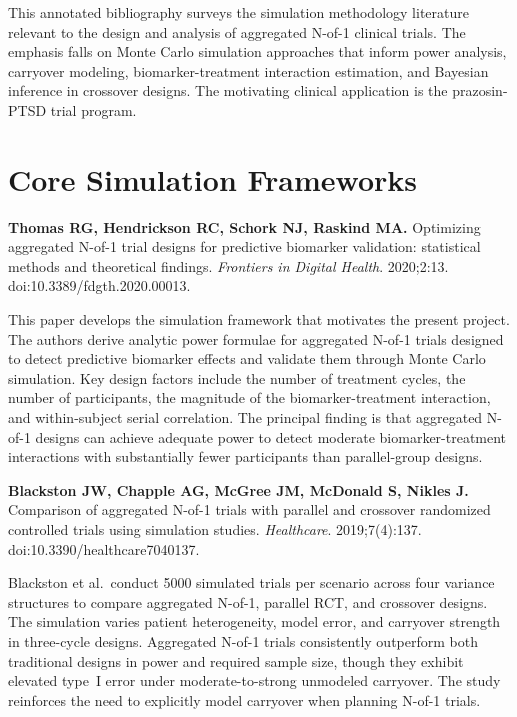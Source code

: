 \documentclass[11pt]{article}
\begin{document}
\maketitle
\thispagestyle{fancy}

This annotated bibliography surveys the simulation
methodology literature relevant to the design and analysis
of aggregated N-of-1 clinical trials. The emphasis falls on
Monte Carlo simulation approaches that inform power
analysis, carryover modeling, biomarker-treatment
interaction estimation, and Bayesian inference in crossover
designs. The motivating clinical application is the
prazosin-PTSD trial program.

\section{Core Simulation Frameworks}

\textbf{Thomas RG, Hendrickson RC, Schork NJ, Raskind MA.}
Optimizing aggregated N-of-1 trial designs for predictive
biomarker validation: statistical methods and theoretical
findings. \textit{Frontiers in Digital Health}.
2020;2:13. doi:10.3389/fdgth.2020.00013.

\smallskip\noindent
This paper develops the simulation framework that motivates
the present project. The authors derive analytic power
formulae for aggregated N-of-1 trials designed to detect
predictive biomarker effects and validate them through
Monte Carlo simulation. Key design factors include the
number of treatment cycles, the number of participants,
the magnitude of the biomarker-treatment interaction, and
within-subject serial correlation. The principal finding is
that aggregated N-of-1 designs can achieve adequate power
to detect moderate biomarker-treatment interactions with
substantially fewer participants than parallel-group
designs.

\medskip
\textbf{Blackston JW, Chapple AG, McGree JM, McDonald S,
Nikles J.} Comparison of aggregated N-of-1 trials with
parallel and crossover randomized controlled trials using
simulation studies. \textit{Healthcare}. 2019;7(4):137.
doi:10.3390/healthcare7040137.

\smallskip\noindent
Blackston et al.\ conduct 5000 simulated trials per
scenario across four variance structures to compare
aggregated N-of-1, parallel RCT, and crossover designs.
The simulation varies patient heterogeneity, model error,
and carryover strength in three-cycle designs. Aggregated
N-of-1 trials consistently outperform both traditional
designs in power and required sample size, though they
exhibit elevated type~I error under moderate-to-strong
unmodeled carryover. The study reinforces the need to
explicitly model carryover when planning N-of-1 trials.
\end{document}
